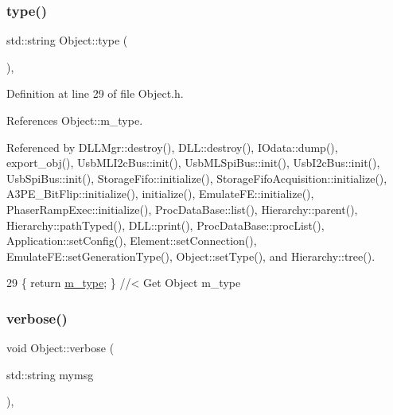 \subsubsection{\texorpdfstring{type()}{type()}}
{\footnotesize\ttfamily std\+::string Object\+::type (\begin{DoxyParamCaption}{ }\end{DoxyParamCaption})\hspace{0.3cm}{\ttfamily [inline]}, {\ttfamily [inherited]}}



Definition at line 29 of file Object.\+h.



References Object\+::m\+\_\+type.



Referenced by D\+L\+L\+Mgr\+::destroy(), D\+L\+L\+::destroy(), I\+Odata\+::dump(), export\+\_\+obj(), Usb\+M\+L\+I2c\+Bus\+::init(), Usb\+M\+L\+Spi\+Bus\+::init(), Usb\+I2c\+Bus\+::init(), Usb\+Spi\+Bus\+::init(), Storage\+Fifo\+::initialize(), Storage\+Fifo\+Acquisition\+::initialize(), A3\+P\+E\+\_\+\+Bit\+Flip\+::initialize(), initialize(), Emulate\+F\+E\+::initialize(), Phaser\+Ramp\+Exec\+::initialize(), Proc\+Data\+Base\+::list(), Hierarchy\+::parent(), Hierarchy\+::path\+Typed(), D\+L\+L\+::print(), Proc\+Data\+Base\+::proc\+List(), Application\+::set\+Config(), Element\+::set\+Connection(), Emulate\+F\+E\+::set\+Generation\+Type(), Object\+::set\+Type(), and Hierarchy\+::tree().


\begin{DoxyCode}
29 \{ \textcolor{keywordflow}{return} \hyperlink{classObject_a457a600fe8c00eb1034374f75110a78c}{m\_type};       \} \textcolor{comment}{//< Get Object m\_type}
\end{DoxyCode}
\mbox{\label{classObject_a83d2db2df682907ea1115ad721c1c4a1}} 
\subsubsection{\texorpdfstring{verbose()}{verbose()}\hspace{0.1cm}{\footnotesize\ttfamily [1/2]}}
{\footnotesize\ttfamily void Object\+::verbose (\begin{DoxyParamCaption}\item[{std\+::string}]{mymsg }\end{DoxyParamCaption})\hspace{0.3cm}{\ttfamily [inline]}, {\ttfamily [inherited]}}



